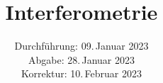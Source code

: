 

\subject{V64}
\title{Interferometrie}
\date{%
  Durchführung: 09.\,Januar 2023
  \\
  Abgabe: 28.\,Januar 2023
  \\
  Korrektur: 10.\,Februar 2023
}



\maketitle
\thispagestyle{empty}
\tableofcontents
\newpage







\newpage
\printbibliography{}


